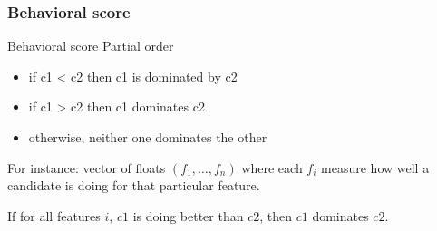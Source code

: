 \documentclass{beamer}
\begin{document}
\frame
{
  \frametitle{Behavioral score}

  \begin{beamerboxesrounded}{Behavioral score}
    Partial order
    \begin{itemize}
    \item<+-> if c1 < c2 then \alert{c1 is dominated by c2}
    \item<+-> if c1 > c2 then \alert{c1 dominates c2}
    \item<+-> otherwise,
      \alert{neither one dominates the other}
    \end{itemize}
  \end{beamerboxesrounded}
  \pause
  For instance: \alert{vector of floats}
  $(f_1, \ldots , f_n)$ where each
  $f_i$ measure how well a candidate is doing for that particular feature.

  If for all features $i$,
  $c1$ is doing better than $c2$, then $c1$ dominates $c2$.
}

\end{document}
